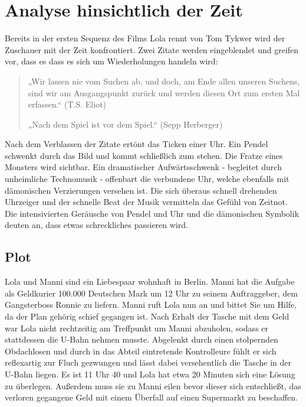 







\thispagestyle{plain}
\pagestyle{plain}

\tableofcontents

\listoffigures


\section{Analyse hinsichtlich der Zeit}



Bereits in der ersten Sequenz des Films Lola rennt von Tom Tykwer wird der Zuschauer mit der Zeit konfrontiert. Zwei Zitate werden eingeblendet und greifen vor, dass es dass es sich um Wiederholungen handeln wird: 

\begin{quote}
„Wir lassen nie vom Suchen ab, und doch, am Ende allen unseren Suchens, sind wir am Ausgangspunkt zurück und werden diesen Ort zum ersten Mal erfassen.“ (T.S. Eliot)
\par„Nach dem Spiel ist vor dem Spiel.“ (Sepp Herberger)
\end{quote}

Nach dem Verblassen der Zitate ertönt das Ticken einer Uhr. Ein Pendel schwenkt durch das Bild und kommt schließlich zum stehen. Die Fratze eines Monsters wird sichtbar. Ein dramatischer Aufwärtsschwenk - begleitet durch unheimliche Technomusik - offenbart die verbundene Uhr, welche ebenfalls mit dämonischen Verzierungen versehen ist. Die sich überaus schnell drehenden Uhrzeiger und der schnelle Beat der Musik vermitteln das Gefühl von Zeitnot. Die intensivierten Geräusche von Pendel und Uhr und die dämonischen Symbolik deuten an, dass etwas schreckliches passieren wird.

\subsection{Plot}

Lola und Manni sind ein Liebespaar wohnhaft in Berlin. Manni hat die Aufgabe als Geldkurier 100.000 Deutschen Mark um 12 Uhr zu seinem Auftraggeber, dem Gangsterboss Ronnie zu liefern. Manni ruft Lola nun an und bittet Sie um Hilfe, da der Plan gehörig schief gegangen ist. Nach Erhalt der Tasche mit dem Geld war Lola nicht rechtzeitig am Treffpunkt um Manni abzuholen, sodass er stattdessen die U-Bahn nehmen musste. Abgelenkt durch einen stolpernden Obdachlosen und durch in das Abteil eintretende Kontrolleure fühlt er sich reflexartig zur Fluch gezwungen und lässt dabei versehentlich die Tasche in der U-Bahn liegen. Es ist 11 Uhr 40 und Lola hat etwa 20 Minuten sich eine Lösung zu überlegen. Außerdem muss sie zu Manni eilen bevor dieser sich entschließt, das verloren gegangene Geld mit einem Überfall auf einen Supermarkt zu beschaffen.

